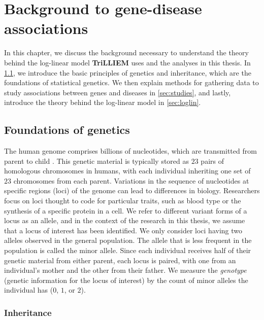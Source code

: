 \chapter{Background to gene-disease associations}\label{chap:background}

In this chapter, we discuss the background necessary to understand the theory behind the log-linear model \textbf{TriLLIEM} uses and the analyses in this thesis.
In \cref{sec:genetics}, we introduce the basic principles of genetics and inheritance, which are the foundations of statistical genetics.
We then explain methods for gathering data to study associations between genes and diseases in \cref{sec:studies}, and lastly, introduce the theory behind the log-linear model in \cref{sec:loglin}.

\section{Foundations of genetics}\label{sec:genetics}

The human genome comprises billions of nucleotides, which are transmitted from parent to child \cite{Port14}.
This genetic material is typically stored as $23$ pairs of homologous chromosomes in humans, with each individual inheriting one set of $23$ chromosomes from each parent.
Variations in the sequence of nucleotides at specific regions (loci) of the genome can lead to differences in biology.
Researchers focus on loci thought to code for particular traits, such as blood type or the synthesis of a specific protein in a cell.
We refer to different variant forms of a locus as an allele, and in the context of the research in this thesis, we assume that a locus of interest has been identified.
We only consider loci having two alleles observed in the general population.
The allele that is less frequent in the population is called the minor allele.
Since each individual receives half of their genetic material from either parent, each locus is paired, with one from an individual's mother and the other from their father.
We measure the \emph{genotype} (genetic information for the locus of interest) by the count of minor alleles the individual has ($0$, $1$, or $2$).

\subsection{Inheritance}

